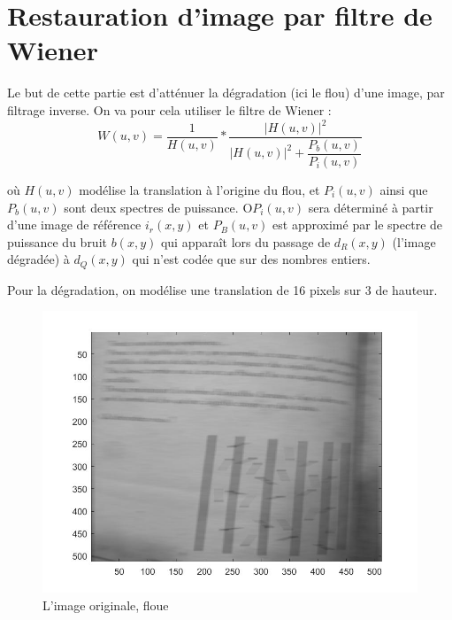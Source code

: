 \documentclass[10pt,a4paper]{article}
\begin{document}
\section{Restauration d'image par filtre de Wiener}
Le but de cette partie est d'atténuer la dégradation (ici le flou) d'une image, par filtrage inverse. On va pour cela utiliser le filtre de Wiener : 
\[
	W(u,v) = \frac{1}{H(u,v)} * \frac{|H(u,v)|^2}{|H(u,v)|^2+\dfrac{P_b(u,v)}{P_i (u,v)}}	
\]

où $H(u,v)$ modélise la translation à l'origine du flou, et $P_i(u,v)$ ainsi que $P_b(u,v)$ sont deux spectres de puissance. O$P_i(u,v)$ sera déterminé à partir d'une image de référence $i_r(x,y)$ et $P_B(u,v)$ est approximé par le spectre de puissance du bruit $b(x,y)$ qui apparaît lors du passage de $d_R(x,y)$ (l'image dégradée) à $d_Q(x,y)$ qui n'est codée que sur des nombres entiers.

Pour la dégradation, on modélise une translation de 16 pixels sur 3 de hauteur.


\begin{figure}[H]	\begin{center}
\includegraphics[scale=0.35]{im_floue.jpg}
\caption{L'image originale, floue}
\label{s1demod}
\end{center}	\end{figure}
\end{document}
